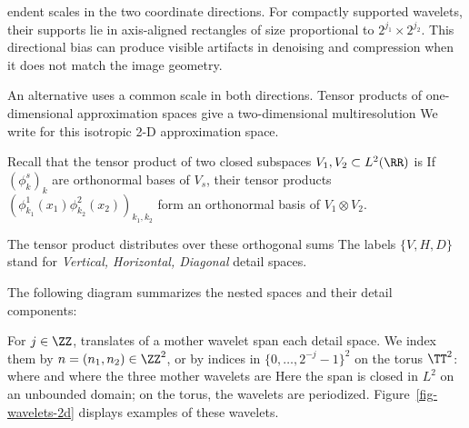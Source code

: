 endent scales in the two coordinate directions. For compactly supported wavelets, their supports lie in axis-aligned rectangles of size proportional to $2^{j_1}\times2^{j_2}$. This directional bias can produce visible artifacts in denoising and compression when it does not match the image geometry.


An alternative uses a common scale in both directions. Tensor products of one-dimensional approximation spaces give a two-dimensional multiresolution
We write
for this isotropic 2-D approximation space.

Recall that the tensor product of two closed subspaces $V_1,V_2\subset L^2(\RR)$ is
If $(\phi_k^s)_k$ are orthonormal bases of $V_s$, their tensor products $(\phi_{k_1}^1(x_1)\phi_{k_2}^2(x_2))_{k_1,k_2}$ form an orthonormal basis of $V_1 \otimes V_2$.

The tensor product distributes over these orthogonal sums
The labels $\{V,H,D\}$ stand for \textit{Vertical, Horizontal, Diagonal} detail spaces.
 
The following diagram summarizes the nested spaces and their detail components:
\begin{center}
\end{center}

For $j \in \ZZ$, translates of a mother wavelet span each detail space. We index them by $n=(n_1,n_2)\in\ZZ^2$, or by indices in $\{0,\ldots,2^{-j}-1\}^2$ on the torus $\TT^2$:
where
and where the three mother wavelets are
Here the span is closed in $L^2$ on an unbounded domain; on the torus, the wavelets are periodized. Figure~\ref{fig-wavelets-2d} displays examples of these wavelets.

